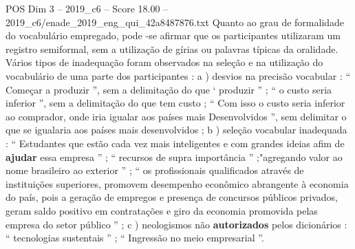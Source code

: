\begin{textsample}{POS Dim 3 – 2019\_c6 – Score 18.00 – 2019\_c6/enade\_2019\_eng\_qui\_42a8487876.txt}
Quanto ao grau de formalidade do vocabulário empregado, pode -se afirmar que os participantes utilizaram um registro semiformal, sem a utilização de gírias ou palavras típicas da oralidade.
Vários tipos de inadequação foram observados na seleção e na utilização do vocabulário de uma parte dos participantes : a ) desvios na precisão vocabular : “ Começar a produzir ”, sem a delimitação do que ‘ produzir ” ; “ o custo seria inferior ”, sem a delimitação do que tem custo ; “ Com isso o custo seria inferior ao comprador, onde iria igualar aos países mais Desenvolvidos ”, sem delimitar o que se igualaria aos países mais desenvolvidos ; b ) seleção vocabular inadequada : “ Estudantes que estão cada vez mais inteligentes e com grandes ideias afim de \textbf{ajudar} essa empresa ” ; “ recursos de supra importância ” ;"agregando valor ao nome brasileiro ao exterior ” ; “ os profissionais qualificados através de instituições superiores, promovem desempenho econômico abrangente à economia do país, pois a geração de empregos e presença de concursos públicos privados, geram saldo positivo em contratações e giro da economia promovida pelas empresa do setor público ” ; c ) neologismos não \textbf{autorizados} pelos dicionários : “ tecnologias sustentais ” ; “ Ingressão no meio empresarial ”.

\end{textsample}
